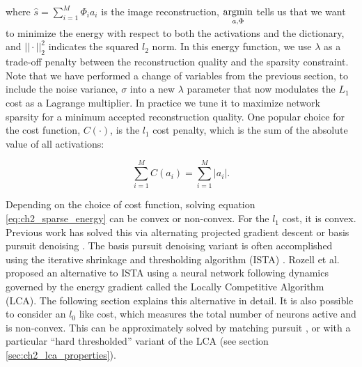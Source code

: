 \noindent where $\hat{s} = \sum\limits_{i=1}^{M}\Phi_{i}a_{i}$ is the image reconstruction, $\argmin\limits_{a, \Phi}$ tells us that we want to minimize the energy with respect to both the activations and the dictionary, and $||\cdot||_2^2$ indicates the squared $l_2$ norm. In this energy function, we use $\lambda$ as a trade-off penalty between the reconstruction quality and the sparsity constraint. Note that we have performed a change of variables from the previous section, to include the noise variance, $\sigma$ into a new $\lambda$ parameter that now modulates the $L_{1}$ cost as a Lagrange multiplier. In practice we tune it to maximize network sparsity for a minimum accepted reconstruction quality. One popular choice for the cost function, $C(\cdot)$, is the $l_1$ cost penalty, which is the sum of the absolute value of all activations:

\begin{equation}\label{eq:ch2_l1_cost}
  \sum\limits_{i=1}^{M}C(a_{i}) = \sum\limits_{i=1}^{M}|a_{i}|.
\end{equation}

Depending on the choice of cost function, solving equation \eqref{eq:ch2_sparse_energy} can be convex or non-convex. For the $l_{1}$ cost, it is convex. Previous work has solved this via alternating projected gradient descent \parencite{olshausen1997sparse} or basis pursuit denoising \parencite{chen2001atomic}. The basis pursuit denoising variant is often accomplished using the iterative shrinkage and thresholding algorithm (ISTA) \parencite{daubechies2004iterative, beck2009fast}. Rozell et al. \citeyearpar{rozell2008sparse} proposed an alternative to ISTA using a neural network following dynamics governed by the energy gradient called the Locally Competitive Algorithm (LCA). The following section explains this alternative in detail. It is also possible to consider an $l_{0}$ like cost, which measures the total number of neurons active and is non-convex. This can be approximately solved by matching pursuit \parencite{davis1997adaptive, rehn2007network, rebollo2002optimized}, or with a particular ``hard thresholded'' variant of the LCA (see section \ref{sec:ch2_lca_properties}).


